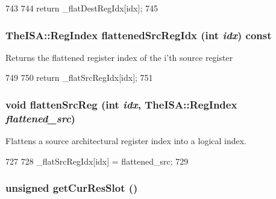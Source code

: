 \begin{DoxyCode}
743     {
744         return _flatDestRegIdx[idx];
745     }
\end{DoxyCode}
\hypertarget{classInOrderDynInst_a9ac37f020700c290097f15cacfd59b33}{
\subsubsection[{flattenedSrcRegIdx}]{\setlength{\rightskip}{0pt plus 5cm}TheISA::RegIndex flattenedSrcRegIdx (int {\em idx}) const}}
\label{classInOrderDynInst_a9ac37f020700c290097f15cacfd59b33}
Returns the flattened register index of the i'th source register 


\begin{DoxyCode}
749     {
750         return _flatSrcRegIdx[idx];
751     }
\end{DoxyCode}
\hypertarget{classInOrderDynInst_a6d7b8014473aa1288b169417e8b2f2fe}{
\subsubsection[{flattenSrcReg}]{\setlength{\rightskip}{0pt plus 5cm}void flattenSrcReg (int {\em idx}, \/  TheISA::RegIndex {\em flattened\_\-src})}}
\label{classInOrderDynInst_a6d7b8014473aa1288b169417e8b2f2fe}
Flattens a source architectural register index into a logical index. 


\begin{DoxyCode}
727     {
728         _flatSrcRegIdx[idx] = flattened_src;
729     }
\end{DoxyCode}
\hypertarget{classInOrderDynInst_a7f7b059d1a3fea3a291eca89c5145de9}{
\subsubsection[{getCurResSlot}]{\setlength{\rightskip}{0pt plus 5cm}unsigned getCurResSlot ()}}
\label{classInOrderDynInst_a7f7b059d1a3fea3a291eca89c5145de9}



